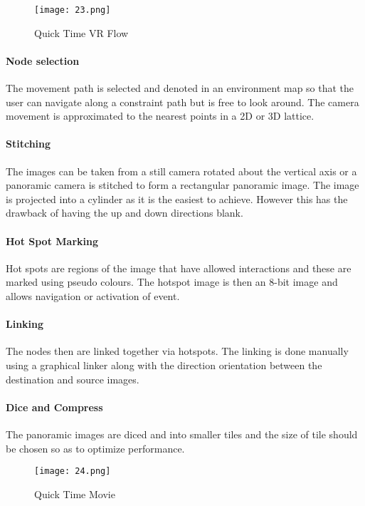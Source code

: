 \begin{figure}[htbp]
\sidecaption
\texttt{[image: 23.png]}
\caption{Quick Time VR Flow}
\label{Fig_23_Quick_flow}       %
\end{figure}

\paragraph*{\textbf{Node selection}}
The movement path is selected and denoted in an environment map so that the user can navigate along a constraint path but is free to look around. The camera movement is approximated to the nearest points in a 2D or 3D lattice. 
\paragraph*{\textbf{Stitching}}
The images can be taken from a still camera rotated about the vertical axis or a panoramic camera is stitched to form a rectangular panoramic image. The image is projected into a cylinder as it is the easiest to achieve. However this has the drawback of having the up and down directions blank.
\paragraph*{\textbf{Hot Spot Marking}}
Hot spots are regions of the image that have allowed interactions and these are marked using pseudo colours. The hotspot image is then an 8-bit image and allows navigation or activation of event.
\paragraph*{\textbf{Linking}}
The nodes then are linked together via hotspots. The linking is done manually using a graphical linker along with the direction orientation between the destination and source images.
\paragraph*{\textbf{Dice and Compress}}
The panoramic images are diced and into smaller tiles and the size of tile should be chosen so as to optimize performance.

\begin{figure}[htbp]
\sidecaption
\texttt{[image: 24.png]}
\caption{Quick Time Movie}
\label{Fig_24_quick_movie}       %
\end{figure}

